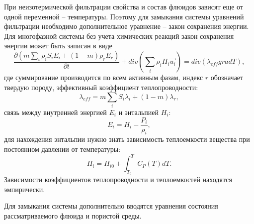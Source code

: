 При неизотермической фильтрации свойства и состав флюидов зависят еще от одной переменной -- температуры.
Поэтому для замыкания системы уравнений фильтрации необходимо дополнительное уравнение --
закон сохранения энергии. Для многофазной системы без учета химических реакций закон сохранения энергии 
может быть записан в виде
\begin{equation}
\label{Energy_law}
  \frac{\partial \left(m {\sum\limits_{i}{\rho_i S_i E_i}} + (1-m){\rho_r E_r}\right)}{\partial t}
    + div(\sum_{i}{\rho_i H_i \overrightarrow{u_i}}) = div(\lambda_{eff} grad T),
\end{equation}
где суммирование производится по всем активным фазам, индекс $r$ обозначает твердую породу,
эффективный коэффициент теплопроводности:
\begin{equation}
\lambda_{eff}=m\sum_i{S_i\lambda_i} + (1-m)\lambda_r,
\end{equation}
связь между внутренней энергией $E_i$ и энтальпией $H_i$:
\begin{equation}
E_i=H_i-\frac{P_i}{\rho_i},
\end{equation} для нахождения энтальпии нужно знать зависимость теплоемкости
вещества при постоянном давлении от температуры:
\begin{equation}
H_i=H_{i0}+\int_{T_0}^{T}{C_P(T)dT}.
\end{equation}
Зависимости коэффициентов теплопроводности и теплоемкостей находятся эмпирически.

Для замыкания системы дополнительно вводятся уравнения состояния рассматриваемого флюида
и пористой среды.
